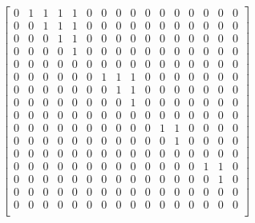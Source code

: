 \documentclass[conference]{IEEEtran}
\begin{document}
\[
\left[
\begin{array}{cccccccccccccccc}
0 & 1 & 1 & 1 & 1 & 0 & 0 & 0 & 0 & 0 & 0 & 0 & 0 & 0 & 0 & 0\\
0 & 0 & 1 & 1 & 1 & 0 & 0 & 0 & 0 & 0 & 0 & 0 & 0 & 0 & 0 & 0\\
0 & 0 & 0 & 1 & 1 & 0 & 0 & 0 & 0 & 0 & 0 & 0 & 0 & 0 & 0 & 0\\
0 & 0 & 0 & 0 & 1 & 0 & 0 & 0 & 0 & 0 & 0 & 0 & 0 & 0 & 0 & 0\\
0 & 0 & 0 & 0 & 0 & 0 & 0 & 0 & 0 & 0 & 0 & 0 & 0 & 0 & 0 & 0\\
0 & 0 & 0 & 0 & 0 & 0 & 1 & 1 & 1 & 0 & 0 & 0 & 0 & 0 & 0 & 0\\
0 & 0 & 0 & 0 & 0 & 0 & 0 & 1 & 1 & 0 & 0 & 0 & 0 & 0 & 0 & 0\\
0 & 0 & 0 & 0 & 0 & 0 & 0 & 0 & 1 & 0 & 0 & 0 & 0 & 0 & 0 & 0\\
0 & 0 & 0 & 0 & 0 & 0 & 0 & 0 & 0 & 0 & 0 & 0 & 0 & 0 & 0 & 0\\
0 & 0 & 0 & 0 & 0 & 0 & 0 & 0 & 0 & 0 & 1 & 1 & 0 & 0 & 0 & 0\\
0 & 0 & 0 & 0 & 0 & 0 & 0 & 0 & 0 & 0 & 0 & 1 & 0 & 0 & 0 & 0\\
0 & 0 & 0 & 0 & 0 & 0 & 0 & 0 & 0 & 0 & 0 & 0 & 0 & 0 & 0 & 0\\
0 & 0 & 0 & 0 & 0 & 0 & 0 & 0 & 0 & 0 & 0 & 0 & 0 & 1 & 1 & 0\\
0 & 0 & 0 & 0 & 0 & 0 & 0 & 0 & 0 & 0 & 0 & 0 & 0 & 0 & 1 & 0\\
0 & 0 & 0 & 0 & 0 & 0 & 0 & 0 & 0 & 0 & 0 & 0 & 0 & 0 & 0 & 0\\
0 & 0 & 0 & 0 & 0 & 0 & 0 & 0 & 0 & 0 & 0 & 0 & 0 & 0 & 0 & 0\\
\end{array}
\right]
\]


\end{document}
